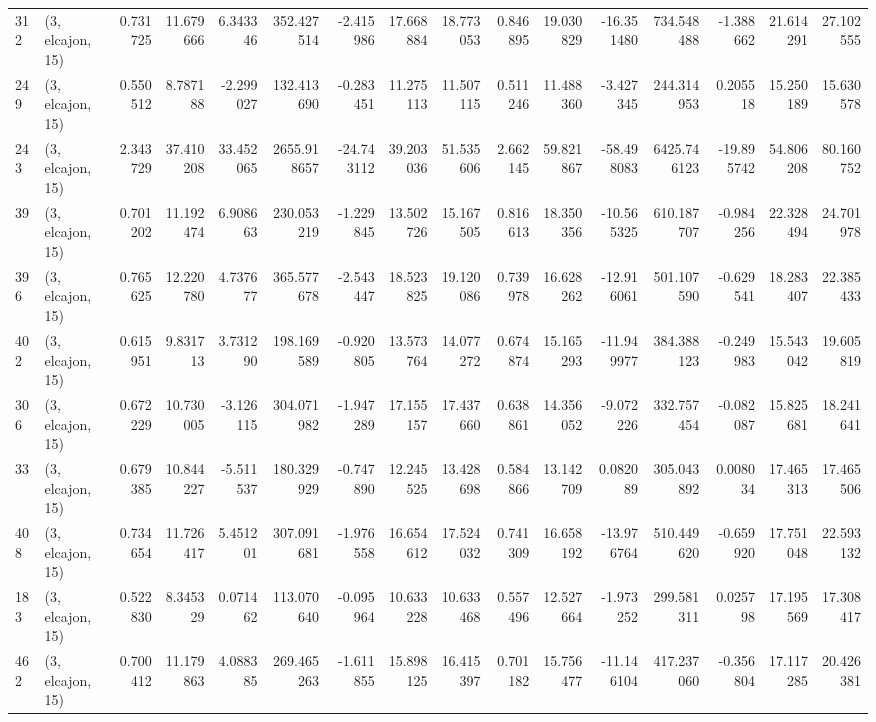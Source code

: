 \begin{tabular}{llrrrrrrrrrrrrrr}
312 &  (3, elcajon, 15) &   0.731725 &  11.679666 &   6.343346 &   352.427514 &  -2.415986 &  17.668884 &  18.773053 &  0.846895 &  19.030829 & -16.351480 &    734.548488 &   -1.388662 &   21.614291 &   27.102555 \\
249 &  (3, elcajon, 15) &   0.550512 &   8.787188 &  -2.299027 &   132.413690 &  -0.283451 &  11.275113 &  11.507115 &  0.511246 &  11.488360 &  -3.427345 &    244.314953 &    0.205518 &   15.250189 &   15.630578 \\
243 &  (3, elcajon, 15) &   2.343729 &  37.410208 &  33.452065 &  2655.918657 & -24.743112 &  39.203036 &  51.535606 &  2.662145 &  59.821867 & -58.498083 &   6425.746123 &  -19.895742 &   54.806208 &   80.160752 \\
39  &  (3, elcajon, 15) &   0.701202 &  11.192474 &   6.908663 &   230.053219 &  -1.229845 &  13.502726 &  15.167505 &  0.816613 &  18.350356 & -10.565325 &    610.187707 &   -0.984256 &   22.328494 &   24.701978 \\
396 &  (3, elcajon, 15) &   0.765625 &  12.220780 &   4.737677 &   365.577678 &  -2.543447 &  18.523825 &  19.120086 &  0.739978 &  16.628262 & -12.916061 &    501.107590 &   -0.629541 &   18.283407 &   22.385433 \\
402 &  (3, elcajon, 15) &   0.615951 &   9.831713 &   3.731290 &   198.169589 &  -0.920805 &  13.573764 &  14.077272 &  0.674874 &  15.165293 & -11.949977 &    384.388123 &   -0.249983 &   15.543042 &   19.605819 \\
306 &  (3, elcajon, 15) &   0.672229 &  10.730005 &  -3.126115 &   304.071982 &  -1.947289 &  17.155157 &  17.437660 &  0.638861 &  14.356052 &  -9.072226 &    332.757454 &   -0.082087 &   15.825681 &   18.241641 \\
33  &  (3, elcajon, 15) &   0.679385 &  10.844227 &  -5.511537 &   180.329929 &  -0.747890 &  12.245525 &  13.428698 &  0.584866 &  13.142709 &   0.082089 &    305.043892 &    0.008034 &   17.465313 &   17.465506 \\
408 &  (3, elcajon, 15) &   0.734654 &  11.726417 &   5.451201 &   307.091681 &  -1.976558 &  16.654612 &  17.524032 &  0.741309 &  16.658192 & -13.976764 &    510.449620 &   -0.659920 &   17.751048 &   22.593132 \\
183 &  (3, elcajon, 15) &   0.522830 &   8.345329 &   0.071462 &   113.070640 &  -0.095964 &  10.633228 &  10.633468 &  0.557496 &  12.527664 &  -1.973252 &    299.581311 &    0.025798 &   17.195569 &   17.308417 \\
462 &  (3, elcajon, 15) &   0.700412 &  11.179863 &   4.088385 &   269.465263 &  -1.611855 &  15.898125 &  16.415397 &  0.701182 &  15.756477 & -11.146104 &    417.237060 &   -0.356804 &   17.117285 &   20.426381 \\

\end{tabular}
